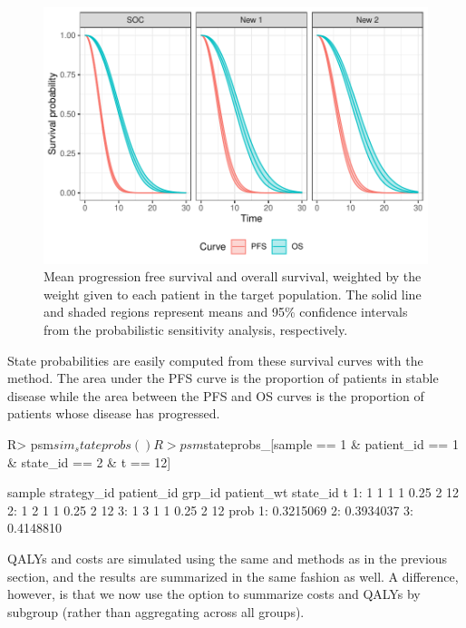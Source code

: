 \documentclass[article, nojss]{jss}\usepackage[]{graphicx}\usepackage[]{color}
\begin{document}
\begin{figure}[h]
\centering
\includegraphics{figure/psm_plot_survival-1.pdf}
\caption{Mean progression free survival and overall survival, weighted by the weight given to each patient in the target population. The solid line and shaded regions represent means and 95\% confidence intervals from the probabilistic sensitivity analysis, respectively.} \label{fig:psm-survival}
\end{figure}

State probabilities are easily computed from these survival curves with the  method. The area under the PFS curve is the proportion of patients in stable disease while the area between the PFS and OS curves is the proportion of patients whose disease has progressed.

\begin{Schunk}
\begin{Sinput}
R> psm$sim_stateprobs()
R> psm$stateprobs_[sample == 1 & patient_id == 1 & state_id == 2 & t == 12]
\end{Sinput}
\begin{Soutput}
   sample strategy_id patient_id grp_id patient_wt state_id  t
1:      1           1          1      1       0.25        2 12
2:      1           2          1      1       0.25        2 12
3:      1           3          1      1       0.25        2 12
        prob
1: 0.3215069
2: 0.3934037
3: 0.4148810
\end{Soutput}
\end{Schunk}

QALYs and costs are simulated using the same  and  methods as in the previous section, and the results are summarized in the same fashion as well. A difference, however, is that we now use the  option to summarize costs and QALYs by subgroup (rather than aggregating across all groups). 
\end{document}
